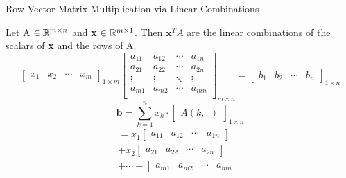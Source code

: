 \documentclass[12pt]{article}
\begin{document}
\begin{defin}{Row Vector Matrix Multiplication via Linear Combinations}

    Let A $\in \mathbb{R}^{m \times n}$ and \textbf{x} $\in \mathbb{R}^{m \times 1}$. Then $\textbf{x}^T A$ are the linear combinations of the scalars of \textbf{x} and the rows of A. 
    \[
    \begin{bmatrix}
        x_1 & x_2 & \cdots & x_m
    \end{bmatrix}_{1 \times m}
    \begin{bmatrix}
        a_{11} & a_{12} & \cdots & a_{1n} \\
        a_{21} & a_{22} & \cdots & a_{2n} \\
        \vdots & \vdots & \ddots & \vdots \\
        a_{m1} & a_{m2} & \cdots & a_{mn} \\
    \end{bmatrix}_{m \times n}
    =
    \begin{bmatrix}
        b_1 & b_2 & \cdots & b_n
    \end{bmatrix}_{1 \times n}
    \]
    \[
    \textbf{b} = \sum_{k=1}^n x_k \cdot 
    \begin{bmatrix}A(k, :)\end{bmatrix}_{1 \times n}
    \]
    \begin{align}
    = x_1 
    \begin{bmatrix}
        a_{11} & a_{12} & \cdots & a_{1n}
    \end{bmatrix}
    \\
    + x_2
    \begin{bmatrix}
        a_{21} & a_{22} & \cdots & a_{2n}
    \end{bmatrix}
    \\
    + \cdots +
    \begin{bmatrix}
        a_{m1} & a_{m2} & \cdots & a_{mn}
    \end{bmatrix}
    \end{align}
\end{defin}
\newpage
\end{document}
